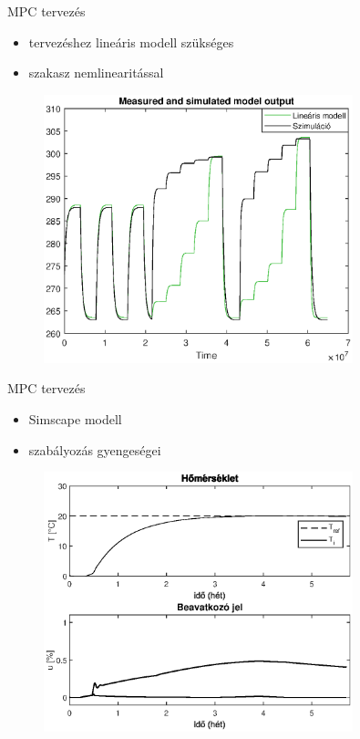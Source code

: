 \documentclass[14pt,handout]{beamer}
\begin{document}
\begin{frame}{MPC tervezés}

\begin{itemize}
\item tervezéshez lineáris modell szükséges
\item szakasz nemlinearitással
\end{itemize}

\begin{figure}
	\centering
	\includegraphics[width=0.8\textwidth]{picture/identModelOutputMatch.eps}	
\end{figure}

\end{frame}


\begin{frame}{MPC tervezés}

\begin{itemize}
\item Simscape modell
\item szabályozás gyengeségei
\end{itemize}

\begin{figure}
\centering
\includegraphics[width=0.8\textwidth]{picture/mpc.eps}	
\end{figure}

\end{frame}
\end{document}
